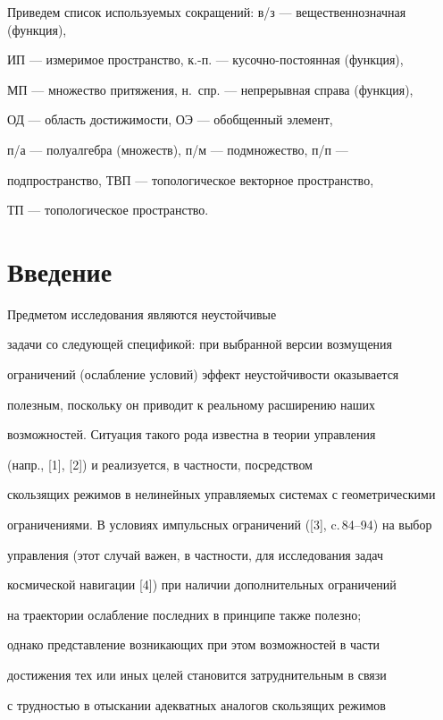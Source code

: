 Приведем список используемых сокращений: в/з --- вещественнозначная (функция),


ИП --- измеримое пространство, к.-п. --- кусочно-постоянная (функция),


МП --- множество притяжения, н.~спр. --- непрерывная справа (функция),


ОД --- область достижимости, ОЭ --- обобщенный элемент,


п/а --- полуалгебра (множеств), п/м --- подмножество, п/п ---


подпространство, ТВП --- топологическое векторное пространство,


ТП --- топологическое пространство.





\section{Введение}





Предметом исследования являются неустойчивые


задачи со следующей спецификой: при выбранной версии возмущения


ограничений (ослабление условий) эффект неустойчивости оказывается


полезным, поскольку он приводит к реальному расширению наших


возможностей. Ситуация такого рода известна в теории управления


(напр., [1], [2]) и реализуется, в частности, посредством


скользящих режимов в нелинейных управляемых системах с геометрическими


ограничениями. В условиях импульсных ограничений ([3], c.\,84--94) на выбор


управления (этот случай важен, в частности, для исследования задач


космической навигации [4]) при наличии дополнительных ограничений


на траектории ослабление последних в принципе также полезно;


однако представление возникающих при этом возможностей в части


достижения тех или иных целей становится затруднительным в связи


с трудностью в отыскании адекватных аналогов скользящих режимов


